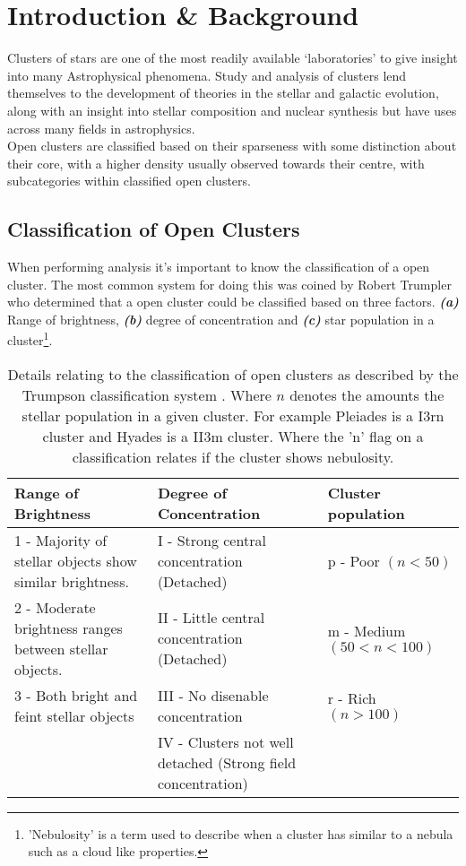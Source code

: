 \section{Introduction \& Background} \label{sc: Introduction}

Clusters of stars are one of the most readily available ‘laboratories’ to give insight into many Astrophysical phenomena. Study and analysis of clusters lend themselves to the development of theories in the stellar and galactic evolution, along with an insight into stellar composition and nuclear synthesis but have uses across many fields in astrophysics. \\
Open clusters are classified based on their sparseness with some distinction about their core, with a higher density usually observed towards their centre, with subcategories within classified open clusters. \cite{nilakshi_sagar_pandey_mohan_2002, trumpler_1930}

\subsection{Classification of Open Clusters}

When performing analysis it's important to know the classification of a open cluster. The most common system for doing this was coined by Robert Trumpler who determined that a open cluster could be classified based on three factors. \textbf{\textit{(a)}} Range of brightness, \textbf{\textit{(b)}} degree of concentration and \textbf{\textit{(c)}} star population in a cluster\footnote{'Nebulosity' is a term used to describe when a cluster has similar to a nebula such as a cloud like properties.}.

\begin{table}[h!]
    \centering
    \begin{tabularx}{\textwidth}{XXX}
        \textbf{Range of Brightness} & \textbf{Degree of Concentration} & \textbf{Cluster population} \\ \hline 
        1 - Majority of stellar objects show similar brightness. & I - Strong central concentration (Detached) & p - Poor $(n < 50)$  \\
        2 - Moderate brightness ranges between stellar objects. & II - Little central concentration (Detached)& m - Medium $(50 < n < 100)$ \\
        3 - Both bright and feint stellar objects  & III - No disenable concentration & r - Rich $(n > 100)$\\ 
          & IV - Clusters not well detached (Strong field concentration) & \\ \hline \hline 
    \end{tabularx}
    \caption{Details relating to the classification of open clusters as described by the Trumpson classification system \cite{trumpler_1930}. Where $n$ denotes the amounts the stellar population in a given cluster. For example Pleiades is a I3rn cluster and Hyades is a II3m cluster. Where the 'n' flag on a classification relates if the cluster shows nebulosity.}
\end{table}

